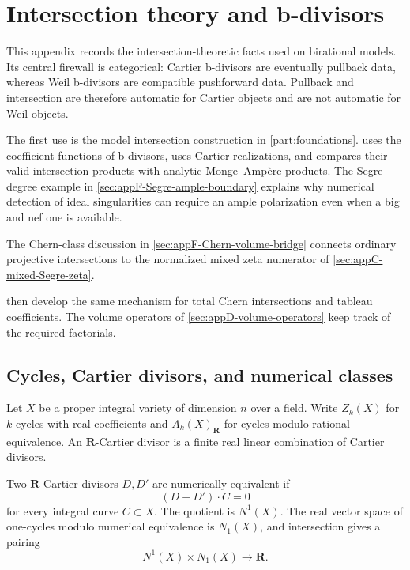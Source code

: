 \chapter{Intersection theory and b-divisors}
\label{app:intersection-bdivisors}

This appendix records the intersection-theoretic facts used on birational
models.
Its central firewall is categorical:
Cartier b-divisors are eventually pullback data, whereas Weil b-divisors are
compatible pushforward data.
Pullback and intersection are therefore automatic for Cartier objects and
are not automatic for Weil objects.

The first use is the model intersection construction in \cref{part:foundations}.
 uses the coefficient functions
of b-divisors,  uses Cartier
realizations, and  compares their valid
intersection products with analytic Monge--Amp\`ere products.
The Segre-degree example in \cref{sec:appF-Segre-ample-boundary}
explains why numerical detection of ideal singularities can require
an ample polarization even when a big and nef one is available.

The Chern-class discussion in \cref{sec:appF-Chern-volume-bridge}
connects ordinary projective intersections to the normalized
mixed zeta numerator of \cref{sec:appC-mixed-Segre-zeta}.

then develop the same mechanism for total Chern intersections
and tableau coefficients. The volume operators of
\cref{sec:appD-volume-operators} keep track of the required factorials.

\section{Cycles, Cartier divisors, and numerical classes}
\label{sec:appF-intersection-basics}

Let \(X\) be a proper integral variety of dimension \(n\) over a field.
Write \(Z_k(X)\) for \(k\)-cycles with real coefficients and
\(A_k(X)_{\mathbf R}\) for cycles modulo rational equivalence.
An \(\mathbf R\)-Cartier divisor is a finite real linear combination of
Cartier divisors.

\begin{definition}
\label{def:appF-numerical}
Two \(\mathbf R\)-Cartier divisors \(D,D'\) are numerically equivalent if
\[
                     (D-D')\cdot C=0
\]
for every integral curve \(C\subset X\).
The quotient is \(N^1(X)\).
The real vector space of one-cycles modulo numerical equivalence is
\(N_1(X)\), and intersection gives a pairing
\[
                           N^1(X)\times N_1(X)\longrightarrow\mathbf R.
\tag{F.1}\label{eq:appF-N1-pairing}
\]
\end{definition}

